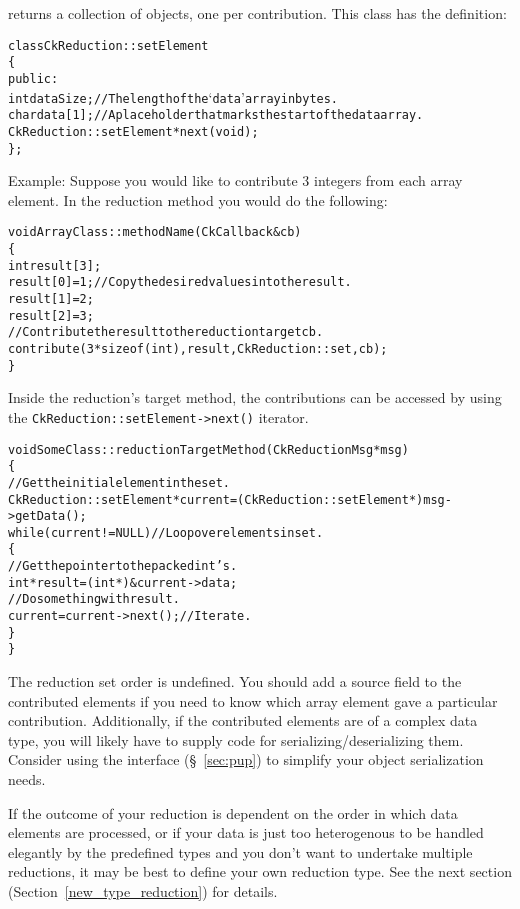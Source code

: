  returns a collection of 
objects, one per contribution.  This class has the definition:

\begin{alltt}
class CkReduction::setElement 
\{
public:
  int dataSize; //The length of the `data' array in bytes.
  char data[1]; //A place holder that marks the start of the data array.
  CkReduction::setElement *next(void);
\};
\end{alltt}

Example: Suppose you would like to contribute 3 integers from each array
element. In the reduction method you would do the following:

\begin{alltt}
void ArrayClass::methodName (CkCallback &cb)
\{
  int result[3];
  result[0] = 1;            // Copy the desired values into the result.
  result[1] = 2;
  result[2] = 3;
  // Contribute the result to the reductiontarget cb.
  contribute(3*sizeof(int), result, CkReduction::set, cb);
\}
\end{alltt}

Inside the reduction's target method, the contributions can be accessed by using
the \texttt{CkReduction::setElement->next()} iterator.

\begin{alltt}
void SomeClass::reductionTargetMethod (CkReductionMsg *msg)
\{
  // Get the initial element in the set.
  CkReduction::setElement *current = (CkReduction::setElement*) msg->getData();
  while(current != NULL) // Loop over elements in set.
  \{
    // Get the pointer to the packed int's.
    int *result = (int*) &current->data;
    // Do something with result.
    current = current->next(); // Iterate.
  \}
\}
\end{alltt}

The reduction set order is undefined.  You should add a source field to the
contributed elements if you need to know which array element gave a particular
contribution.  Additionally, if the contributed elements are of a complex 
data type, you will likely have to supply code for 
serializing/deserializing them.
Consider using the 
interface (\S~\ref{sec:pup}) to simplify your object serialization
needs.

If the outcome of your reduction is dependent on the order in which 
data elements are processed, or if your data is just too
heterogenous to be handled elegantly by the predefined types and you
don't want to undertake multiple reductions, it may be best to define
your own reduction type.  See the next section
(Section~\ref{new_type_reduction}) for details.

